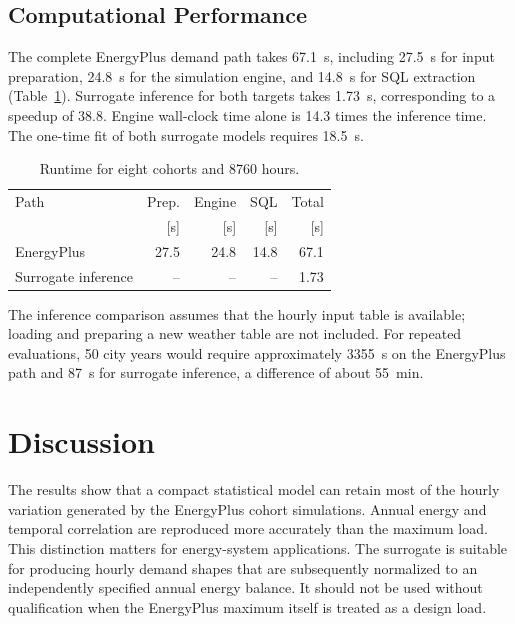 \documentclass[10pt,twocolumn]{article}
\begin{document}
\subsection{Computational Performance}

The complete EnergyPlus demand path takes \SI{67.1}{\second}, including
\SI{27.5}{\second} for input preparation, \SI{24.8}{\second} for the simulation
engine, and \SI{14.8}{\second} for SQL extraction
(Table~\ref{tab:runtime}). Surrogate inference for both targets takes
\SI{1.73}{\second}, corresponding to a speedup of 38.8. Engine wall-clock time
alone is 14.3 times the inference time. The one-time fit of both surrogate
models requires \SI{18.5}{\second}.

\begin{table}[t]
\centering
\caption{Runtime for eight cohorts and 8760 hours.}
\label{tab:runtime}
\small
\begin{tabular}{lrrrr}
\toprule
Path & Prep. & Engine & SQL & Total \\
 & [s] & [s] & [s] & [s] \\
\midrule
EnergyPlus & 27.5 & 24.8 & 14.8 & 67.1 \\
Surrogate inference & -- & -- & -- & 1.73 \\
\bottomrule
\end{tabular}
\end{table}

The inference comparison assumes that the hourly input table is available;
loading and preparing a new weather table are not included. For repeated
evaluations, 50 city years would require approximately \SI{3355}{\second} on
the EnergyPlus path and \SI{87}{\second} for surrogate inference, a difference
of about \SI{55}{\minute}.

\section{Discussion}

The results show that a compact statistical model can retain most of the
hourly variation generated by the EnergyPlus cohort simulations. Annual
energy and temporal correlation are reproduced more accurately than the
maximum load. This distinction matters for energy-system applications. The
surrogate is suitable for producing hourly demand shapes that are subsequently
normalized to an independently specified annual energy balance. It should not
be used without qualification when the EnergyPlus maximum itself is treated as
a design load.
\end{document}

